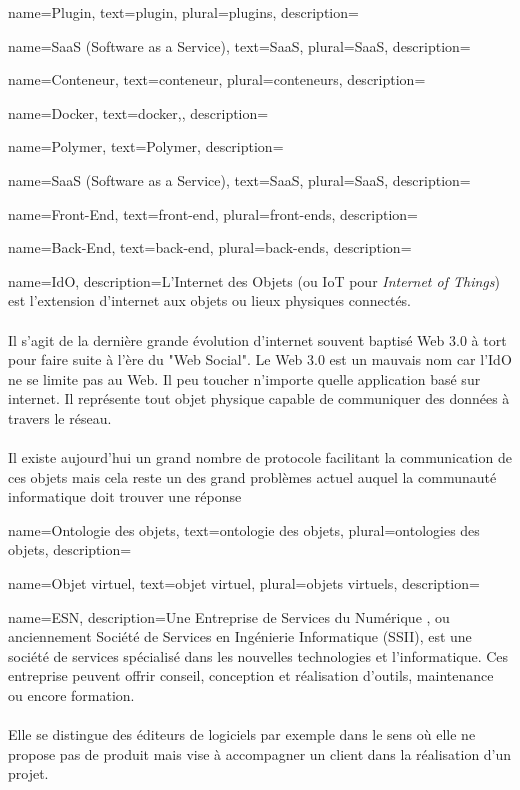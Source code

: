 \makeglossaries

{
    name=Plugin,
    text=plugin,
    plural=plugins,
    description={}
}

{
    name=SaaS (Software as a Service),
    text=SaaS,
    plural=SaaS,
    description={}
}

{
    name=Conteneur,
    text=conteneur,
    plural=conteneurs,
    description={}
}

{
    name=Docker,
    text=docker,,
    description={}
}

{
    name=Polymer,
    text=Polymer,
    description={}
}

{
    name=SaaS (Software as a Service),
    text=SaaS,
    plural=SaaS,
    description={}
}

{
    name=Front-End,
    text=front-end,
    plural=front-ends,
    description={}
}

{
    name=Back-End,
    text=back-end,
    plural=back-ends,
    description={}
}

{
    name=IdO,
    description={L'Internet des Objets (ou IoT pour \textit{Internet of Things}) est l'extension d'internet aux objets ou lieux physiques connectés.\\\\
    Il s'agit de la dernière grande évolution d'internet souvent baptisé Web 3.0 à tort pour faire suite à l'ère du "Web Social". Le Web 3.0 est un mauvais nom car l'IdO ne se limite pas au Web. Il peu toucher n'importe quelle application basé sur internet. Il représente tout objet physique capable de communiquer des données à travers le réseau. \\\\
    Il existe aujourd'hui un grand nombre de protocole facilitant la communication de ces objets mais cela reste un des grand problèmes actuel auquel la communauté informatique doit trouver une réponse}
}

{
    name=Ontologie des objets,
    text=ontologie des objets,
    plural=ontologies des objets,
    description={}
}

{
    name=Objet virtuel,
    text=objet virtuel,
    plural=objets virtuels,
    description={}
}

{
	name=ESN,
    description={Une Entreprise de Services du Numérique , ou anciennement Société de Services en Ingénierie Informatique (SSII), est une société de services spécialisé dans les nouvelles technologies et l’informatique. Ces entreprise peuvent offrir conseil, conception et réalisation d’outils, maintenance ou encore formation.\\\\
    Elle se distingue des éditeurs de logiciels par exemple dans le sens où elle ne propose pas de produit mais vise à accompagner un client dans la réalisation d'un projet.}
}

